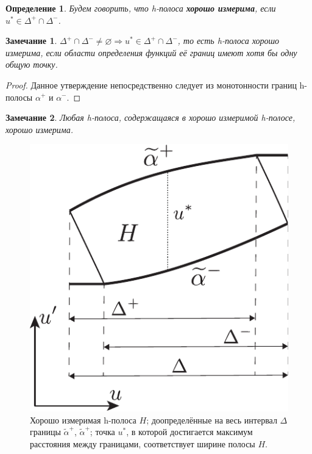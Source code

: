 \documentclass{article}
\newtheorem*{definition}{Определение}
\newtheorem{remark}{Замечание}
\begin{document}
\begin{definition}
	Будем говорить, что \emph{h}-полоса {\bf хорошо измерима}, если $u^* \in \Delta^+ \cap \Delta^-$.	
\end{definition}

\begin{remark}
	$\Delta^+ \cap \Delta^- \neq \varnothing \Rightarrow u^* \in \Delta^+ \cap \Delta^-$, то есть \emph{h}-полоса хорошо измерима, если области определения функций её границ имеют хотя бы одну общую точку. 
\end{remark}
\begin{proof}
	Данное утверждение непосредственно следует из монотонности границ h-полосы $\alpha^+$ и $\alpha^-$.
\end{proof}

\begin{remark}
	Любая \emph{h}-полоса, содержащаяся в хорошо измеримой \emph{h}-полосе, хорошо измерима.
\label{rem:well-h-strip}
\end{remark}

\begin{figure}[h]
\centering
  \includegraphics[scale = 0.8]{pic/width definition}
  \caption{Хорошо измеримая h-полоса $H$; доопределённые на весь интервал $\Delta$ границы $\widetilde{\alpha}^+$, $\widetilde{\alpha}^+$; точка $u^*$, в которой достигается максимум расстояния между границами, соответствует ширине полосы $H$.}
\label{fig:width-definition}
\end{figure}
\end{document}
